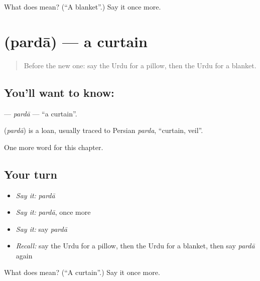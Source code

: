 \begin{tcolorbox}[breakable,colback=teal!4,colframe=teal!35!black,title={Before you move on}]
What does  mean? (\textquotedblleft{}A blanket\textquotedblright{}.) Say it once more.
\end{tcolorbox}
\section[\texorpdfstring{\ur{پردہ} (pardā)}{پردہ (pardā)}]{ (pardā) — a curtain}

\label{lesson:UR-C107-parda}



\begin{quote}
Before the new one: say the Urdu for a pillow, then the Urdu for a blanket.
\end{quote}

\subsection*{You'll want to know: }
\textbf{} — \emph{pardā} — \textquotedblleft{}a curtain\textquotedblright{}.

\begin{cousinweb}
\textbf{} (\emph{pardā}) is a loan, usually traced to Persian \emph{parda}, \textquotedblleft{}curtain, veil\textquotedblright{}.
\end{cousinweb}

\begin{grammarlens}[title={What you've built}]
One more word for this chapter.
\end{grammarlens}

\subsection*{Your turn}
\begin{itemize}
\raggedright
  \item \emph{Say it:} \emph{pardā}
  \item \emph{Say it:} \emph{pardā}, once more
  \item \emph{Say it:} say \emph{pardā}
  \item \emph{Recall:} say the Urdu for a pillow, then the Urdu for a blanket, then say \emph{pardā} again
\end{itemize}

\begin{tcolorbox}[breakable,colback=teal!4,colframe=teal!35!black,title={Before you move on}]
What does  mean? (\textquotedblleft{}A curtain\textquotedblright{}.) Say it once more.
\end{tcolorbox}
